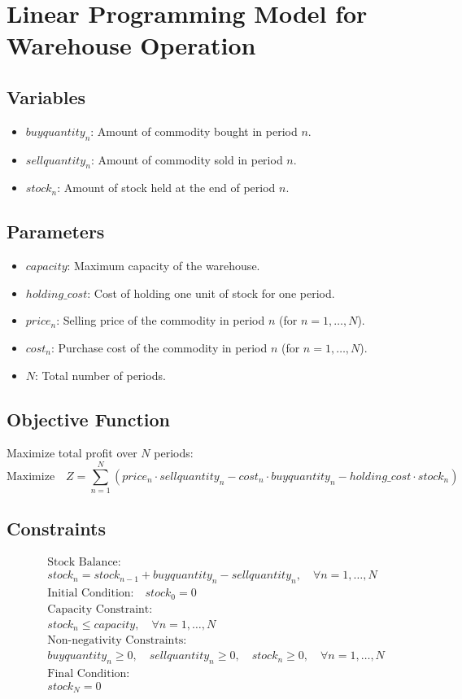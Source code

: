 \documentclass{article}
\begin{document}
\section*{Linear Programming Model for Warehouse Operation}

\subsection*{Variables}
\begin{itemize}
    \item $buyquantity_n$: Amount of commodity bought in period $n$.
    \item $sellquantity_n$: Amount of commodity sold in period $n$.
    \item $stock_n$: Amount of stock held at the end of period $n$.
\end{itemize}

\subsection*{Parameters}
\begin{itemize}
    \item $capacity$: Maximum capacity of the warehouse.
    \item $holding\_cost$: Cost of holding one unit of stock for one period.
    \item $price_n$: Selling price of the commodity in period $n$ (for $n = 1, \ldots, N$).
    \item $cost_n$: Purchase cost of the commodity in period $n$ (for $n = 1, \ldots, N$).
    \item $N$: Total number of periods.
\end{itemize}

\subsection*{Objective Function}
Maximize total profit over $N$ periods:
\[
\text{Maximize} \quad Z = \sum_{n=1}^{N} (price_n \cdot sellquantity_n - cost_n \cdot buyquantity_n - holding\_cost \cdot stock_n)
\]

\subsection*{Constraints}
\begin{align*}
    & \text{Stock Balance:} \\
    & stock_n = stock_{n-1} + buyquantity_n - sellquantity_n, \quad \forall n = 1, \ldots, N \\
    & \text{Initial Condition:} \quad stock_0 = 0 \\
    & \text{Capacity Constraint:} \\
    & stock_n \leq capacity, \quad \forall n = 1, \ldots, N \\
    & \text{Non-negativity Constraints:} \\
    & buyquantity_n \geq 0, \quad sellquantity_n \geq 0, \quad stock_n \geq 0, \quad \forall n = 1, \ldots, N \\
    & \text{Final Condition:} \\
    & stock_N = 0
\end{align*}
\end{document}
